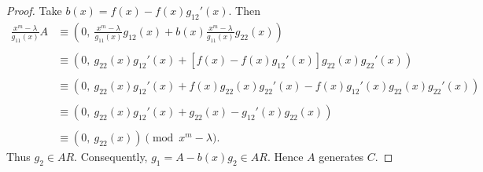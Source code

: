 \documentclass[10pt,a4paper]{amsart}
\begin{document}
\begin{proof}
 Take $b(x)=f(x)-f(x)g_{12}'(x)$. Then
 \begin{equation*}
     \begin{split}
         \frac{x^m-\lambda}{g_{11}(x)}A&\equiv \left (0,\ \frac{x^m-\lambda}{g_{11}(x)}g_{12}(x)+b(x)\frac{x^m-\lambda}{g_{11}(x)}g_{22}(x)\right )\\
         \\
         &\equiv (0,\ g_{22}(x)g_{12}'(x)+[f(x)-f(x)g_{12}'(x)]g_{22}(x)g_{22}'(x))\\
         \\
         &\equiv (0,\ g_{22}(x)g_{12}'(x)+f(x)g_{22}(x)g_{22}'(x)-f(x)g_{12}'(x)g_{22}(x)g_{22}'(x))\\
         \\
         &\equiv (0,\  g_{22}(x)g_{12}'(x)+g_{22}(x)-g_{12}'(x)g_{22}(x))\\
         \\
         &\equiv (0,\ g_{22}(x)) \pmod{x^m-\lambda}.
     \end{split}
 \end{equation*}
 Thus $g_2\in AR$. Consequently, $g_1=A-b(x)g_2\in AR$. Hence $A$ generates $C$.
 \end{proof}
\end{document}
